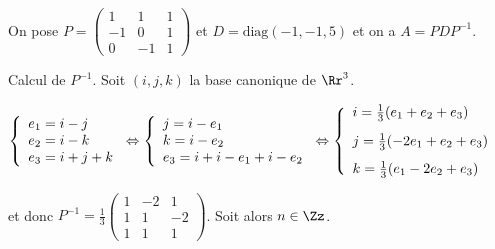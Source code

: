{{On pose $P=\left(
\begin{array}{ccc}
1&1&1\\
-1&0&1\\
0&-1&1
\end{array}
\right)$ et $D=\text{diag}(-1,-1,5)$ et on a $A =PDP^{-1}$.

Calcul de $P^{-1}$. Soit $(i,j,k)$ la base canonique de $\Rr^3$.

\begin{center}
$\left\{
\begin{array}{l}
e_1=i-j\\
e_2=i-k\\
e_3=i+j+k
\end{array}
\right.\Leftrightarrow\left\{
\begin{array}{l}
j=i-e_1\\
k=i-e_2\\
e_3=i+i-e_1+i-e_2
\end{array}
\right.\Leftrightarrow\left\{
\begin{array}{l}
i=\frac{1}{3}(e_1+e_2+e_3)\\
\rule[-4mm]{0mm}{10mm}j=\frac{1}{3}(-2e_1+e_2+e_3)\\
k=\frac{1}{3}(e_1-2e_2+e_3)
\end{array}
\right.$
\end{center}

et donc $P^{-1}=\frac{1}{3}\left(
\begin{array}{ccc}
1&-2&1\\
1&1&-2\\
1&1&1
\end{array}
\right)$. Soit alors $n\in\Zz$.

}}
